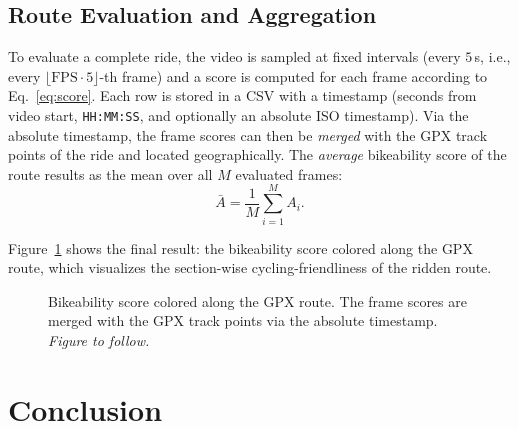 \documentclass[letterpaper,journal]{IEEEtran}
\begin{document}
\subsection{Route Evaluation and Aggregation}
To evaluate a complete ride, the video is sampled at fixed intervals
(every $5$\,s, i.e., every $\lfloor \text{FPS}\cdot 5\rfloor$-th frame)
and a score is computed for each frame according to
Eq.~\eqref{eq:score}. Each row is stored in a CSV with a timestamp
(seconds from video start, \texttt{HH:MM:SS}, and optionally an absolute
ISO timestamp). Via the absolute timestamp, the frame scores can then be
\emph{merged} with the GPX track points of the ride and located
geographically. The \emph{average} bikeability score of the route
results as the mean over all $M$ evaluated frames:
\begin{equation}
\label{eq:avg}
\bar{A} = \frac{1}{M} \sum_{i=1}^{M} A_i .
\end{equation}

Figure~\ref{fig:route} shows the final result: the bikeability score
colored along the GPX route, which visualizes the section-wise
cycling-friendliness of the ridden route.

\begin{figure}[!t]
\centering
\caption{Bikeability score colored along the GPX route. The frame scores
are merged with the GPX track points via the absolute timestamp.
\emph{Figure to follow.}}
\label{fig:route}
\end{figure}


\section{Conclusion}




\end{document}
